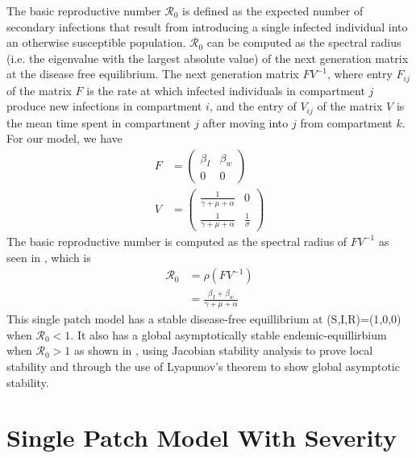 \documentclass[12pt]{article}\usepackage[]{graphicx}\usepackage[]{color}
\begin{document}
The basic reproductive number ${\mathcal R_0}$ is defined as the expected number of secondary infections that result from introducing a single infected individual into an otherwise susceptible
population.
${\mathcal R_0}$ can be computed as the spectral radius (i.e. the eigenvalue with the largest absolute value) of the next generation matrix at the disease free equilibrium.
The next generation matrix $FV^{−1}$, where entry $F_{ij}$ of the matrix $F$ is the rate at which infected individuals in compartment $j$ produce new infections in compartment $i$, and the entry of $V_{ij}$ of the matrix $V$ is the mean time spent in compartment $j$ after moving into $j$ from compartment $k$.
For our model, we have
\begin{align*}
		F&=\begin{pmatrix}
			\beta_I & \beta_w\\
			0 & 0
			\end{pmatrix}\\
		V&=\begin{pmatrix}
			\frac{1}{\gamma+\mu+\alpha} & 0\\
			\frac{1}{\gamma+\mu+\alpha} &\frac{1}{\sigma}
			\end{pmatrix}
\end{align*}
The basic reproductive number is computed as the spectral radius of $FV^{-1}$ as seen in \cite{link9}, which is
\begin{align*}
    {\mathcal R_0} &= \rho(FV^{-1})\\
		           &=\frac{\beta_I+\beta_w}{\gamma+\mu+\alpha}
\end{align*}
This single patch model has a stable disease-free equillibrium at (S,I,R)=(1,0,0) when ${\mathcal R_0}<1$.
It also has a global asymptotically stable endemic-equillirbium when ${\mathcal R_0}>1$ as shown in \cite{link9}, using Jacobian stability
analysis to prove local stability and through the use of Lyapunov's theorem to show global asymptotic stability.


\section{Single Patch Model With Severity}
\end{document}
